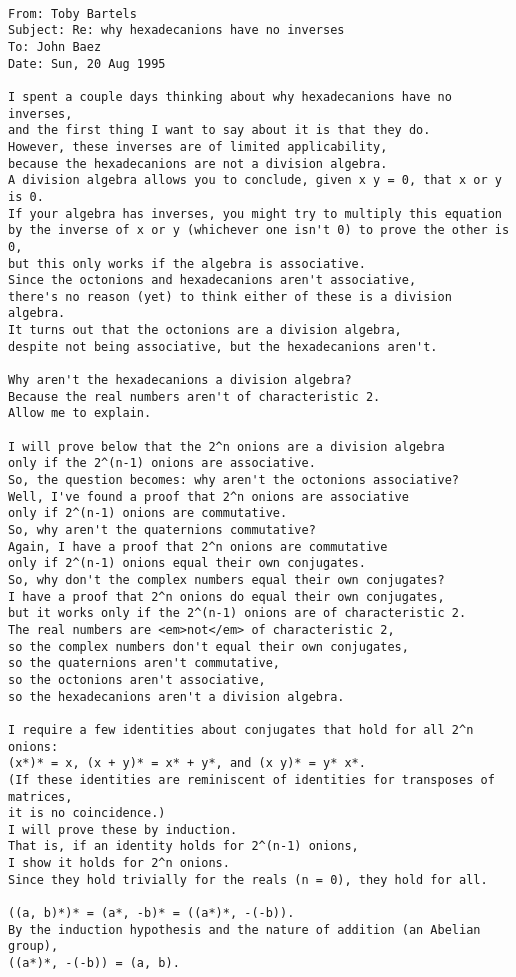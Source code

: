 \begin{verbatim}

From: Toby Bartels
Subject: Re: why hexadecanions have no inverses
To: John Baez
Date: Sun, 20 Aug 1995 

I spent a couple days thinking about why hexadecanions have no inverses,
and the first thing I want to say about it is that they do.
However, these inverses are of limited applicability,
because the hexadecanions are not a division algebra.
A division algebra allows you to conclude, given x y = 0, that x or y is 0.
If your algebra has inverses, you might try to multiply this equation
by the inverse of x or y (whichever one isn't 0) to prove the other is 0,
but this only works if the algebra is associative.
Since the octonions and hexadecanions aren't associative,
there's no reason (yet) to think either of these is a division algebra.
It turns out that the octonions are a division algebra,
despite not being associative, but the hexadecanions aren't.

Why aren't the hexadecanions a division algebra?
Because the real numbers aren't of characteristic 2.
Allow me to explain.

I will prove below that the 2^n onions are a division algebra
only if the 2^(n-1) onions are associative.
So, the question becomes: why aren't the octonions associative?
Well, I've found a proof that 2^n onions are associative
only if 2^(n-1) onions are commutative.
So, why aren't the quaternions commutative?
Again, I have a proof that 2^n onions are commutative
only if 2^(n-1) onions equal their own conjugates.
So, why don't the complex numbers equal their own conjugates?
I have a proof that 2^n onions do equal their own conjugates,
but it works only if the 2^(n-1) onions are of characteristic 2.
The real numbers are <em>not</em> of characteristic 2,
so the complex numbers don't equal their own conjugates,
so the quaternions aren't commutative,
so the octonions aren't associative,
so the hexadecanions aren't a division algebra.

I require a few identities about conjugates that hold for all 2^n onions:
(x*)* = x, (x + y)* = x* + y*, and (x y)* = y* x*.
(If these identities are reminiscent of identities for transposes of matrices,
it is no coincidence.)
I will prove these by induction.
That is, if an identity holds for 2^(n-1) onions,
I show it holds for 2^n onions.
Since they hold trivially for the reals (n = 0), they hold for all.

((a, b)*)* = (a*, -b)* = ((a*)*, -(-b)).
By the induction hypothesis and the nature of addition (an Abelian group),
((a*)*, -(-b)) = (a, b).


\end{verbatim}

